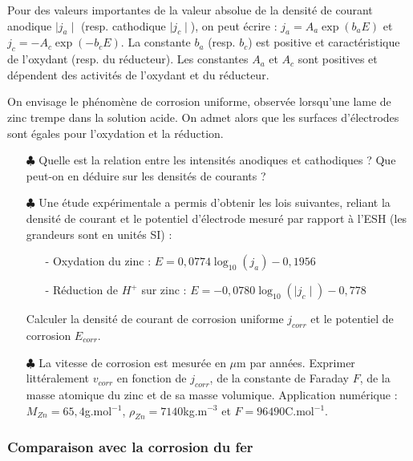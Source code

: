 \documentclass{report}
\begin{document}
Pour des valeurs importantes de la valeur absolue de la densité de courant anodique $\mid j_a\mid$ (resp. cathodique $\mid j_c\mid$), on peut écrire : $j_a=A_a\exp(b_aE)$ et $j_c=-A_c\exp(-b_cE)$. La constante $b_a$ (resp. $b_c$) est positive et caractéristique de l'oxydant (resp. du réducteur). Les constantes $A_a$ et $A_c$ sont positives et dépendent des activités de l'oxydant et du réducteur.

On envisage le phénomène de corrosion uniforme, observée lorsqu'une lame de zinc trempe dans la solution acide. On admet alors que les surfaces d'électrodes sont égales pour l'oxydation et la réduction. 

\begin{itemize}

	\item[$\clubsuit$] Quelle est la relation entre les intensités anodiques et cathodiques ? Que peut-on en déduire sur les densités de courants ?
	
	\item[$\clubsuit$] Une étude expérimentale a permis d'obtenir les lois suivantes, reliant la densité de courant et le potentiel d'électrode mesuré par rapport à l'ESH (les grandeurs sont en unités SI) :
	\begin{itemize}
		\item[-] Oxydation du zinc : $E=0,0774\log_{10}(j_a)-0,1956$
		\item[-] Réduction de $H^+$ sur zinc : $E=-0,0780\log_{10}(\mid j_c\mid)-0,778$
	\end{itemize}
Calculer la densité de courant de corrosion uniforme $j_{corr}$ et le potentiel de corrosion $E_{corr}$.

	\item[$\clubsuit$] La vitesse de corrosion est mesurée en $\mu$m par années. Exprimer littéralement $v_{corr}$ en fonction de $j_{corr}$, de la constante de Faraday $F$, de la masse atomique du zinc et de sa masse volumique. Application numérique : $M_{Zn}=65,4$g.mol$^{-1}$, $\rho_{Zn}=7140$kg.m$^{-3}$ et $F=96490$C.mol$^{-1}$.
\end{itemize}

\subsubsection*{Comparaison avec la corrosion du fer}
\end{document}
